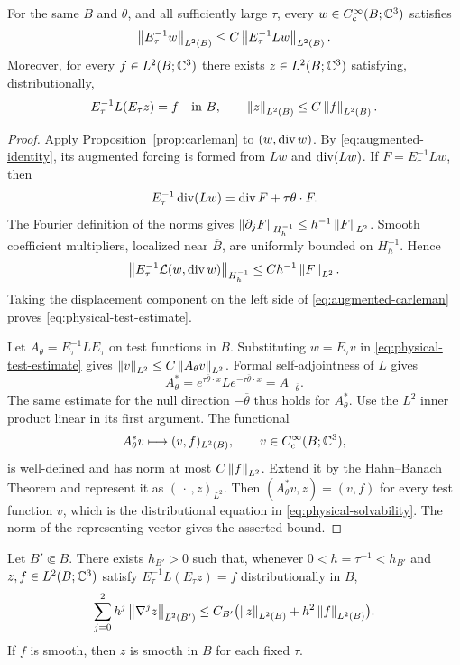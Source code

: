\begin{corollary}
\label{cor:physical-solvability}
For the same $B$ and $\theta$, and all sufficiently large $\tau$,
every $w\in C_c^\infty(B;\mathbb C^3)$
satisfies
\begin{equation}
\label{eq:physical-test-estimate}
 \left\lVert E_\tau^{-1}w\right\rVert_{L^2(B)}
 \le C\left\lVert E_\tau^{-1}Lw\right\rVert_{L^2(B)}.
\end{equation}
Moreover, for every $f\in L^2(B;\mathbb C^3)$ there exists
$z\in L^2(B;\mathbb C^3)$ satisfying, distributionally,
\begin{equation}
\label{eq:physical-solvability}
 E_\tau^{-1}L(E_\tau z)=f\quad\text{in }B,
 \qquad \left\lVert z\right\rVert_{L^2(B)}\le C\left\lVert f\right\rVert_{L^2(B)}.
\end{equation}
\end{corollary}

\begin{proof}
Apply Proposition~\ref{prop:carleman} to $(w,\operatorname{div} w)$.
By \eqref{eq:augmented-identity}, its augmented forcing is formed
from $Lw$ and $\operatorname{div}(Lw)$. If $F=E_\tau^{-1}Lw$, then
\[
 E_\tau^{-1}\operatorname{div}(Lw)=\operatorname{div} F+\tau\theta\cdot F.
\]
The Fourier definition of the norms gives
$\left\lVert \partial_jF\right\rVert_{H_h^{-1}}\le h^{-1}\left\lVert F\right\rVert_{L^2}$.
Smooth coefficient multipliers, localized near $\overline B$, are
uniformly bounded on $H_h^{-1}$. Hence
\[
 \left\lVert E_\tau^{-1}\mathcal L(w,\operatorname{div} w)\right\rVert_{H_h^{-1}}
 \le Ch^{-1}\left\lVert F\right\rVert_{L^2}.
\]
Taking the displacement component on the left side of
\eqref{eq:augmented-carleman} proves
\eqref{eq:physical-test-estimate}.

Let $A_\theta=E_\tau^{-1}LE_\tau$ on test functions in $B$.
Substituting $w=E_\tau v$ in
\eqref{eq:physical-test-estimate} gives
$\left\lVert v\right\rVert_{L^2}\le C\left\lVert A_\theta v\right\rVert_{L^2}$.
Formal self-adjointness of $L$ gives
\[
 A_\theta^*
 =e^{\tau\overline\theta\cdot x}L
                      e^{-\tau\overline\theta\cdot x}
 =A_{-\overline\theta}.
\]
The same estimate for the null direction $-\overline\theta$ thus
holds for $A_\theta^*$. Use the $L^2$ inner product linear in its
first argument. The functional
\[
 A_\theta^*v\longmapsto (v,f)_{L^2(B)},
 \qquad v\in C_c^\infty(B;\mathbb C^3),
\]
is well-defined and has norm at most $C\left\lVert f\right\rVert_{L^2}$. Extend it by
the Hahn--Banach Theorem and represent it as $(\,\cdot\,,z)_{L^2}$.
Then $(A_\theta^*v,z)=(v,f)$ for every test function $v$, which is
the distributional equation in \eqref{eq:physical-solvability}.
The norm of the representing vector gives the asserted bound.
\end{proof}

\begin{lemma}
\label{lem:scaled-interior}
Let $B'\Subset B$. There exists $h_{B'}>0$ such that, whenever
$0<h=\tau^{-1}<h_{B'}$ and $z,f\in L^2(B;\mathbb C^3)$ satisfy
$E_\tau^{-1}L(E_\tau z)=f$ distributionally in $B$,
\begin{equation}
\label{eq:scaled-interior}
 \sum_{j=0}^2 h^j\left\lVert \nabla^jz\right\rVert_{L^2(B')}
 \le C_{B'}\bigl(\left\lVert z\right\rVert_{L^2(B)}
                         +h^2\left\lVert f\right\rVert_{L^2(B)}\bigr).
\end{equation}
If $f$ is smooth, then $z$ is smooth in $B$ for each fixed $\tau$.
\end{lemma}

